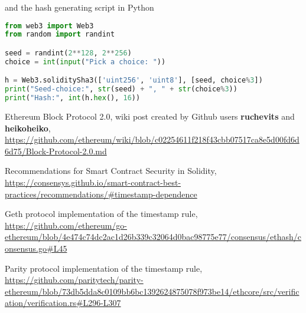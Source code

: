 \documentclass{article}
\begin{document}
    \noindent and the hash generating script in Python
    \begin{lstlisting}[language=Python]
from web3 import Web3
from random import randint

seed = randint(2**128, 2**256)
choice = int(input("Pick a choice: "))

h = Web3.soliditySha3(['uint256', 'uint8'], [seed, choice%3])
print("Seed-choice:", str(seed) + ", " + str(choice%3))
print("Hash:", int(h.hex(), 16))
    \end{lstlisting}

    \begin{thebibliography}{9}
        Ethereum Block Protocol 2.0, wiki post created by
        Github users {\bfseries ruchevits} and {\bfseries
        heikoheiko},
        \url{https://github.com/ethereum/wiki/blob/c02254611f218f43cbb07517ca8e5d00fd6d6d75/Block-Protocol-2.0.md}
        
        Recommendations for Smart Contract Security in
        Solidity,
        \url{https://consensys.github.io/smart-contract-best-practices/recommendations/#timestamp-dependence}
        
        Geth protocol implementation of the timestamp rule,
        \url{https://github.com/ethereum/go-ethereum/blob/4e474c74dc2ac1d26b339c32064d0bac98775e77/consensus/ethash/consensus.go#L45}

        Parity protocol implementation of the timestamp
        rule,
        \url{https://github.com/paritytech/parity-ethereum/blob/73db5dda8c0109bb6bc1392624875078f973be14/ethcore/src/verification/verification.rs#L296-L307}
    \end{thebibliography}
\end{document}
